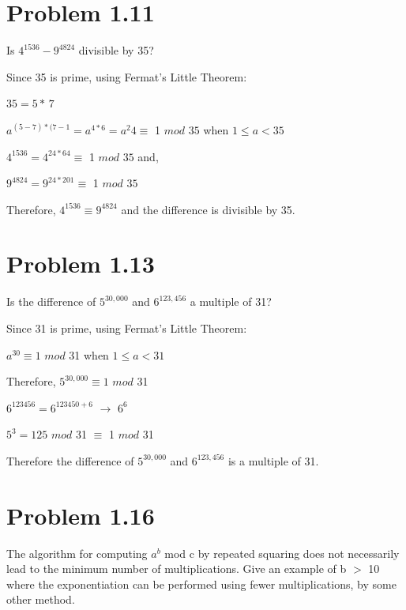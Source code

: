\documentclass{article}
\begin{document}
\section{Problem 1.11}
Is $4^{1536} - 9^{4824}$ divisible by 35?
\vspace{2mm}

Since 35 is prime, using Fermat's Little Theorem:
\begin{center}
$35 = 5 *\, 7$

$a^{(5-7)*(7-1} = a^{4*6} = a^{2}4 \equiv$ 1 $mod$ $35$ when $1 \leq a < 35$ 
\vspace{2mm}

$4^{1536} = 4^{24*64} \equiv$ 1 $mod$ $35$ and,

$9^{4824} = 9^{24*201} \equiv$ 1 $ mod$ $35$
\vspace{2mm}
\end{center}

Therefore, $4^{1536} \equiv 9^{4824}$ and the difference is divisible by 35.

\section{Problem 1.13}
Is the difference of $5^{30,000}$ and $6^{123,456}$ a multiple of 31?
\vspace{2mm}

Since 31 is prime, using Fermat's Little Theorem:

\begin{center}
$a^{30} \equiv 1$ $mod$ 31 when $1 \leq a < 31$

Therefore, $5^{30,000} \equiv 1$ $mod$ 31
\vspace{2mm}

$6^{123456} = 6^{123450 + 6}$ $\rightarrow$ $6^{6}$

$5^{3} = 125$ $mod$ 31 $\equiv$ 1 $mod$ 31
\end{center}

Therefore the difference of $5^{30,000}$ and $6^{123,456}$ is a multiple of 31.

\section{Problem 1.16}
The algorithm for computing $a^{b}$ mod c by repeated squaring does not necessarily lead to the
minimum number of multiplications. Give an example of b $>$ 10 where the exponentiation can
be performed using fewer multiplications, by some other method.
\vspace{2mm}
\end{document}
